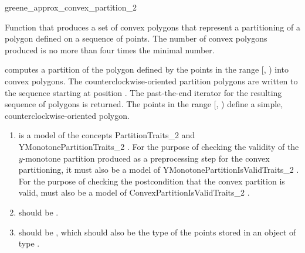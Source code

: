 \begin{ccRefFunction}{greene_approx_convex_partition_2}

\ccDefinition
Function that produces a set of 
convex polygons that represent a partitioning of a polygon defined
on a sequence of points.
The number of convex polygons produced is 
no more than four times the minimal number.%


{
computes a partition of the polygon defined 
by the points in the range [, ) into convex 
polygons. The counterclockwise-oriented partition polygons are written to
the sequence starting at position .  The past-the-end iterator for 
the resulting sequence of polygons is returned.
\ccPrecond The points in the range [, ) define a simple,
counterclockwise-oriented polygon.
}

\begin{enumerate}
    \item {} is a model of the concepts PartitionTraits\_2%
           and 
          YMonotonePartitionTraits\_2%
          . 
          For the purpose of 
          checking the validity of the $y$-monotone partition produced as
          a preprocessing step for the convex partitioning, it must also 
          be a model of YMonotonePartitionIsValidTraits\_2
          . 
          For the purpose of checking
          the postcondition that the convex partition is valid, 
          must also be a model of ConvexPartitionIsValidTraits\_2%
          . 
    \item {} should be .
    \item {} should be ,
          which should also be the type of the points stored in an object
          of type .
\end{enumerate}


\end{ccRefFunction}
